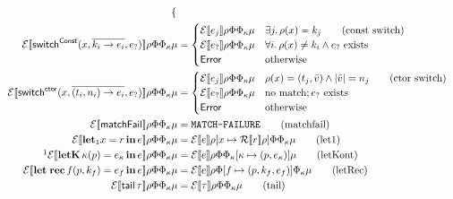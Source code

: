 \documentclass[a4paper, 11pt]{article}
\theoremstyle{remark}\newtheorem*{remark}{Remark}
\theoremstyle{definition}\newtheorem*{definition}{Definition}
\begin{document}
\begin{align*}
\begin{cases}
\end{cases}\\
\mathcal{E}\sem{\switch^{\Const}(x, \overline{k_i \to e_i}, e_?)}\Env\FunTab\KontTab\mu &=
\begin{cases}
  \mathcal{E}\sem{e_j}\Env\FunTab\KontTab\mu
  & \exists j.\, \Env(x) = k_j \tag{const switch} \\
  \mathcal{E}\sem{e_? }\Env\FunTab\KontTab\mu
  & \forall i.\, \Env(x) \neq k_i \land e_? \ \text{exists} \\
  \mathsf{Error} & \text{otherwise}
\end{cases}\\
\mathcal{E}\sem{\switch^{\ctor}(x, \overline{(t_i, n_i) \to e_i}, e_?)}\Env\FunTab\KontTab\mu &=
\begin{cases}
  \mathcal{E}\sem{e_j}\Env\FunTab\KontTab\mu
  & \Env(x) = (t_j, \bar{v}) \land |\bar{v}| = n_j \tag{ctor switch} \\
  \mathcal{E}\sem{e_?}\Env\FunTab\KontTab\mu
  & \text{no match}; e_?\ \text{exists} \\
  \mathsf{Error} & \text{otherwise}
\end{cases}\\
\mathcal{E}\sem{\fail}\Env\FunTab\KontTab\mu &= \texttt{MATCH-FAILURE} \tag{matchfail}\\
\mathcal{E}\sem{\letone x = r\, \mathbf{in}\, e}\Env\FunTab\KontTab\mu &=
\mathcal{E}\sem{e}\Env[x \mapsto \mathcal{R}\sem{r}\Env]\FunTab\KontTab\mu \tag{let1}\\
\footnotemark\mathcal{E}\sem{\letK\, \kappa(p) = e_\kappa\, \mathbf{in}\, e}\Env\FunTab\KontTab\mu &=
\mathcal{E}\sem{e}\Env\FunTab\KontTab[\kappa \mapsto (p, e_\kappa)]\mu \tag{letKont}\\
\mathcal{E}\sem{\letRec\, f(p, k_f) = e_f\, \mathbf{in}\, e}\Env\FunTab\KontTab\mu &=
\mathcal{E}\sem{e}\Env\FunTab[f \mapsto (p, k_f, e_f)]\KontTab\mu \tag{letRec}\\
\mathcal{E}\sem{\mathsf{tail}\, \tau}\Env\FunTab\KontTab\mu &=
\mathcal{E}\sem{\tau}\Env\FunTab\KontTab\mu \tag{tail}
\end{align*}
\endgroup

\addtocounter{footnote}{-2}
\end{document}

